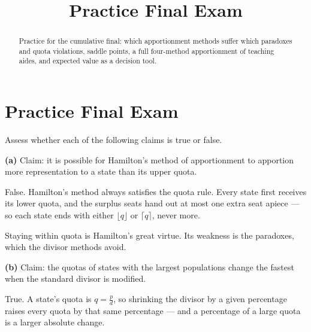\documentclass[12pt]{ximera}
\title{Practice Final Exam}
\begin{document}
\begin{abstract}
Practice for the cumulative final: which apportionment methods suffer which paradoxes
and quota violations, saddle points, a full four-method apportionment of teaching
aides, and expected value as a decision tool.
\end{abstract}
\maketitle

\section*{Practice Final Exam}

\begin{problem}
Assess whether each of the following claims is true or false.

\begin{prompt}
\textbf{(a)} Claim: it is possible for Hamilton's method of apportionment to apportion
more representation to a state than its upper quota.

\begin{multipleChoice}
\end{multipleChoice}

\begin{feedback}
False. Hamilton's method always satisfies the quota rule. Every state first receives its
lower quota, and the surplus seats hand out at most one extra seat apiece --- so each
state ends with either $\lfloor q\rfloor$ or $\lceil q\rceil$, never more.

Staying within quota is Hamilton's great virtue. Its weakness is the paradoxes, which
the divisor methods avoid.
\end{feedback}
\end{prompt}

\begin{prompt}
\textbf{(b)} Claim: the quotas of states with the largest populations change the fastest
when the standard divisor is modified.

\begin{multipleChoice}
\end{multipleChoice}

\begin{feedback}
True. A state's quota is $q = \frac{p}{d}$, so shrinking the divisor by a given
percentage raises every quota by that same percentage --- and a percentage of a large
quota is a larger absolute change.


\end{feedback}
\end{prompt}
\end{problem}
\end{document}
